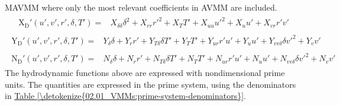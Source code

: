 \documentclass[review]{elsarticle}
\begin{document}
\sphinxAtStartPar
MAVMM where only the most relevant coefficients in AVMM are included.
\begin{equation}\label{equation:02.01_VMMs:eqxmartins_simple}
\begin{split}\begin{split}
\operatorname{X_{D}'}{\left(u',v',r',\delta,T' \right)} = & X_{\delta\delta} \delta^{2} + X_{rr} r'^{2} + X_{T} T' + X_{uu} u'^{2} + X_{u} u' + X_{vr} r' v' 
\end{split}\end{split}
\end{equation}\begin{equation}\label{equation:02.01_VMMs:eqymartins_simple}
\begin{split}\begin{split}
\operatorname{Y_{D}'}{\left(u',v',r',\delta,T' \right)} = & Y_{\delta} \delta + Y_{r} r' + Y_{T\delta} \delta T' + Y_{T} T' + Y_{ur} r' u' + Y_{u} u' + Y_{vv\delta} \delta v'^{2} + Y_{v} v' 
\end{split}\end{split}
\end{equation}\begin{equation}\label{equation:02.01_VMMs:eqnmartins_simple}
\begin{split}\begin{split}
\operatorname{N_{D}'}{\left(u',v',r',\delta,T' \right)} = & N_{\delta} \delta + N_{r} r' + N_{T\delta} \delta T' + N_{T} T' + N_{ur} r' u' + N_{u} u' + N_{vv\delta} \delta v'^{2} + N_{v} v' 
\end{split}\end{split}
\end{equation}
\sphinxAtStartPar
The hydrodynamic functions above are expressed with nondimensional prime units. The quantities are expressed in the prime system, using the denominators in \hyperref[\detokenize{02.01_VMMs:prime-system-denominators}]{Table \ref{\detokenize{02.01_VMMs:prime-system-denominators}}}.
\end{document}

